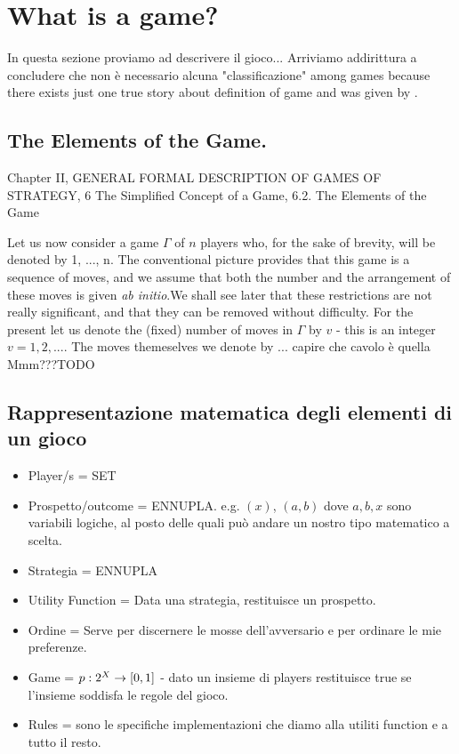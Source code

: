 \chapter{What is a game?}
In questa sezione proviamo ad descrivere il gioco... 
Arriviamo addirittura a concludere che non \`e necessario alcuna "classificazione" among games because there exists just one true story about definition of game and was given by \cite{vonNeumann1944}.

\section{The Elements of the Game. \cite{vonNeumann1944}}
Chapter II, GENERAL FORMAL DESCRIPTION OF GAMES OF STRATEGY, 6 The Simplified Concept of a Game, 6.2. The Elements of the Game

Let us now consider a game $\Gamma$ of $n$ players who, for the sake of brevity, will be denoted by 1, ..., n. The conventional picture provides that this game is a sequence of moves, and we assume that both the number and the arrangement of these moves is given \emph{ab initio}.We shall see later that these restrictions are not really significant, and that they can be removed without difficulty. For the present let us denote the (fixed) number of moves in $\Gamma$ by $v$ - this is an integer $v=1,2,...$. The moves themeselves we denote by ... capire che cavolo \`e quella Mmm???TODO

\section{Rappresentazione matematica degli elementi di un gioco}
\begin{itemize}
 \item Player/s          = SET
 \item Prospetto/outcome = ENNUPLA. e.g. $(x)$, $(a,b)$ dove $a, b, x$ sono variabili logiche, al posto delle quali pu\`o andare un nostro tipo matematico a scelta.
 \item Strategia         = ENNUPLA
 \item Utility Function  = Data una strategia, restituisce un prospetto.
 \item Ordine            = Serve per discernere le mosse dell'avversario e per ordinare le mie preferenze.
 \item Game              = $p:2^X \to [0,1]$ - dato un insieme di players restituisce true se l'insieme soddisfa le regole del gioco.
 \item Rules             = sono le specifiche implementazioni che diamo alla utiliti function e a tutto il resto.
\end{itemize}


